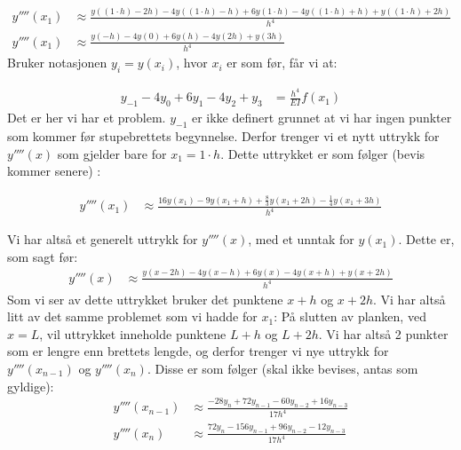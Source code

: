 \begin{align}
	y''''(x_1)&\approx \frac{y((1\cdot h)-2h)-4y((1\cdot h)-h)+6y(1\cdot h)-4y((1\cdot h)+h)+y((1\cdot h)+2h)}{h^4}\nonumber \\
	y''''(x_1)&\approx \frac{y(-h)-4y(0)+6y(h)-4y(2h)+y(3h)}{h^4}
\end{align}
Bruker notasjonen $y_i=y(x_i)$, hvor $x_i$ er som før, får vi at: 

\begin{align}
    y_{-1}-4y_0+6y_1-4y_2+y_3&=\frac{h^4}{EI}f(x_1)
\end{align}
Det er her vi har et problem. $y_{-1}$ er ikke definert grunnet at vi har ingen punkter som kommer før stupebrettets begynnelse. Derfor trenger vi et nytt uttrykk for $y''''(x)$ som gjelder bare for $x_1=1 \cdot h$. Dette uttrykket er som følger (bevis kommer senere) : 

\begin{align}
    y''''(x_1) &\approx \frac{16y(x_1)-9y(x_1+h)+\frac{8}{3}y(x_1+2h)-\frac{1}{4}y(x_1+3h)}{h^4}
\end{align}

Vi har altså et generelt uttrykk for $y''''(x)$, med et unntak for $y(x_1)$. Dette er, som sagt før: 
\begin{align}
     y''''(x)& \approx \frac{y(x-2h)-4y(x-h)+6y(x)-4y(x+h)+y(x+2h)}{h^4}
 \end{align} 
 Som vi ser av dette uttrykket bruker det punktene $x+h$ og $x+2h$. Vi har altså litt av det samme problemet som vi hadde for $x_1$: På slutten av planken, ved $x=L$, vil uttrykket inneholde punktene $L+h$ og $L+2h$. Vi har altså 2 punkter som er lengre enn brettets lengde, og derfor trenger vi nye uttrykk for $y''''(x_{n-1})$ og $y''''(x_n)$. Disse er som følger (skal ikke bevises, antas som gyldige): 
\begin{align}
    y''''(x_{n-1})&\approx \frac{-28y_n+72y_{n-1}-60y_{n-2}+16y_{n-3}}{17h^4} \\
    y''''(x_n)&\approx \frac{72y_n-156y_{n-1}+96y_{n-2}-12y_{n-3}}{17h^4}
\end{align}

